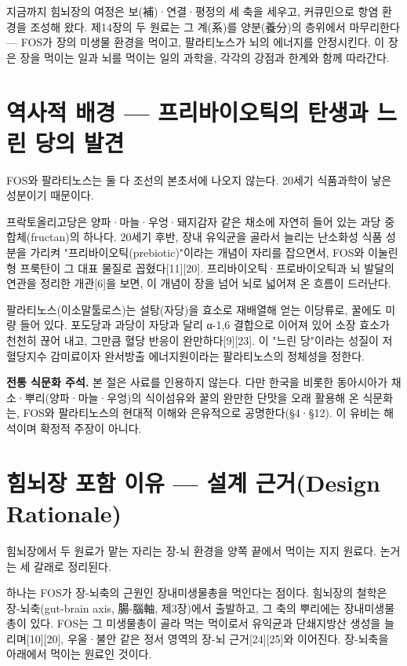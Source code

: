 \documentclass[12pt,oneside]{book}
\newenvironment{authnote}
  {\par\smallskip\begingroup\leftskip=6mm\rightskip=3mm\small\color{muted}\noindent\ignorespaces}
  {\par\endgroup\smallskip}
\begin{document}
지금까지 힘뇌장의 여정은 보(補)·연결·평정의 세 축을 세우고, 커큐민으로 항염 환경을 조성해 왔다. 제14장의 두 원료는 그 계(系)를 양분(養分)의 층위에서 마무리한다 — FOS가 장의 미생물 환경을 먹이고, 팔라티노스가 뇌의 에너지를 안정시킨다. 이 장은 장을 먹이는 일과 뇌를 먹이는 일의 과학을, 각각의 강점과 한계와 함께 따라간다.

\section{역사적 배경 — 프리바이오틱의 탄생과 느린 당의 발견}

FOS와 팔라티노스는 둘 다 조선의 본초서에 나오지 않는다. 20세기 식품과학이 낳은 성분이기 때문이다.

프락토올리고당은 양파·마늘·우엉·돼지감자 같은 채소에 자연히 들어 있는 과당 중합체(fructan)의 하나다. 20세기 후반, 장내 유익균을 골라서 늘리는 난소화성 식품 성분을 가리켜 "프리바이오틱(prebiotic)"이라는 개념이 자리를 잡으면서, FOS와 이눌린형 프룩탄이 그 대표 물질로 꼽혔다[11][20]. 프리바이오틱·프로바이오틱과 뇌 발달의 연관을 정리한 개관[6]을 보면, 이 개념이 장을 넘어 뇌로 넓어져 온 흐름이 드러난다.

팔라티노스(이소말툴로스)는 설탕(자당)을 효소로 재배열해 얻는 이당류로, 꿀에도 미량 들어 있다. 포도당과 과당이 자당과 달리 α-1,6 결합으로 이어져 있어 소장 효소가 천천히 끊어 내고, 그만큼 혈당 반응이 완만하다[9][23]. 이 "느린 당"이라는 성질이 저혈당지수 감미료이자 완서방출 에너지원이라는 팔라티노스의 정체성을 정한다.

\begin{authnote}\textbf{전통 식문화 주석.} 본 절은 사료를 인용하지 않는다. 다만 한국을 비롯한 동아시아가 채소·뿌리(양파·마늘·우엉)의 식이섬유와 꿀의 완만한 단맛을 오래 활용해 온 식문화는, FOS와 팔라티노스의 현대적 이해와 은유적으로 공명한다(§4·§12). 이 유비는 해석이며 확정적 주장이 아니다.\end{authnote}

\section{힘뇌장 포함 이유 — 설계 근거(Design Rationale)}

힘뇌장에서 두 원료가 맡는 자리는 장-뇌 환경을 양쪽 끝에서 먹이는 지지 원료다. 논거는 세 갈래로 정리된다.

하나는 FOS가 장-뇌축의 근원인 장내미생물총을 먹인다는 점이다. 힘뇌장의 철학은 장-뇌축(gut-brain axis, 腸-腦軸, 제3장)에서 출발하고, 그 축의 뿌리에는 장내미생물총이 있다. FOS는 그 미생물총이 골라 먹는 먹이로서 유익균과 단쇄지방산 생성을 늘리며[10][20], 우울·불안 같은 정서 영역의 장-뇌 근거[24][25]와 이어진다. 장-뇌축을 아래에서 먹이는 원료인 것이다.
\end{document}
